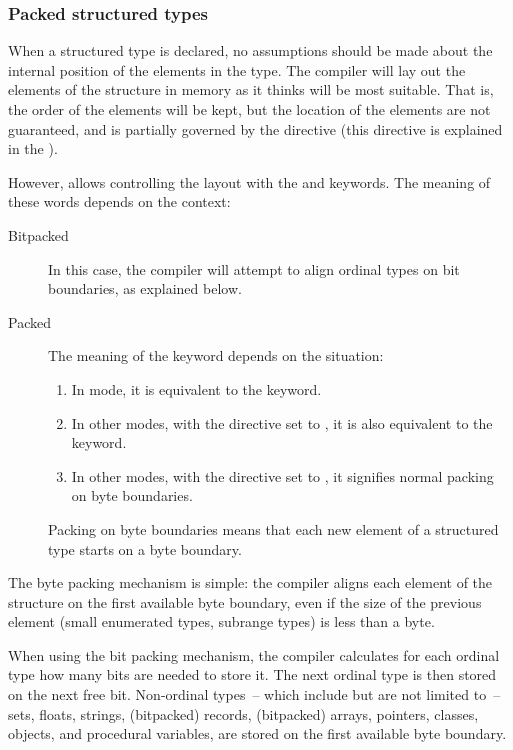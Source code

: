 \subsubsection{Packed structured types}
When a structured type is declared, no assumptions should be made about
the internal position of the elements in the type. The compiler will lay
out  the elements of the structure in memory as it thinks will be most
suitable. That is, the order of the elements will be kept, but the location
of the elements are not guaranteed, and is partially governed by the 
directive (this directive is explained in the \progref).

 
However, \fpc allows controlling the layout with the  and
 keywords. The meaning of these words depends on the context:
\begin{description}
\item[Bitpacked] In this case, the compiler will attempt to align ordinal
types on bit boundaries, as explained below.
\item[Packed] The meaning of the  keyword depends on the
situation:
\begin{enumerate}
\item In  mode, it is equivalent to the  keyword.
\item In other modes, with the  directive set to ,
it is also equivalent to the  keyword.
\item In other modes, with the  directive set to ,
it signifies normal packing on byte boundaries.
\end{enumerate}
Packing on byte boundaries means that each new element of a structured type
starts on a byte boundary.
\end{description}

The byte packing mechanism is simple: the compiler aligns each element of
the structure on the first available byte boundary, even if the size of the
previous element (small enumerated types, subrange types) is less than a
byte.

When using the bit packing mechanism, the compiler calculates for each
ordinal type how many bits are needed to store it. The next ordinal type
is then stored on the next free bit. Non-ordinal types~-- which include but
are not limited to~-- sets, floats, strings, (bitpacked) records, (bitpacked)
arrays, pointers, classes, objects, and procedural variables, are stored
on the first available byte boundary.

